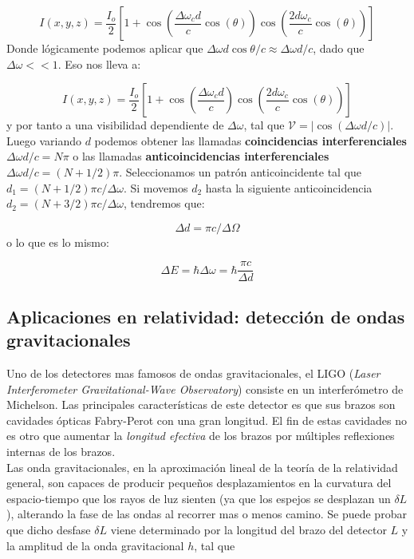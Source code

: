 \documentclass[12pt,a4paper]{book}
\numberwithin{equation}{section}
\numberwithin{figure}{section}
\newcommand{\parentesis}[1]{\left( #1  \right)}
\newcommand{\ccorchetes}[1]{\left[ #1  \right]}
\newcommand{\1}{_{(1)}}
\newcommand{\2}{_{(2)}}
\theoremstyle{definition}
\begin{document}
\begin{equation}
I(x,y,z) = \frac{I_o}{2}  \ccorchetes{1+ \cos \parentesis{\frac{\Delta \omega_c d}{c} \cos (\theta)} \cos \parentesis{\frac{2d\omega_c}{c} \cos (\theta)}}
\end{equation}
Donde lógicamente podemos aplicar que $\Delta \omega d \cos \theta /c \approx \Delta \omega d/c$, dado que $\Delta \omega << 1$. Eso nos lleva a:


\begin{equation}
I(x,y,z) = \frac{I_o}{2}  \ccorchetes{1+ \cos \parentesis{\frac{\Delta \omega_c d}{c}} \cos \parentesis{\frac{2d\omega_c}{c} \cos (\theta)}}
\end{equation}
y por tanto a una visibilidad dependiente de $\Delta \omega$, tal que $\mathcal{V}= |\cos (\Delta \omega d /c)|$. Luego variando $d$ podemos obtener las llamadas \textbf{coincidencias interferenciales} $\Delta \omega d /c = N \pi$ o las llamadas \textbf{anticoincidencias interferenciales} $\Delta \omega d / c = (N+1/2) \pi$. Seleccionamos un patrón anticoincidente tal que $d_1=(N+1/2)\pi c /\Delta \omega$. Si movemos $d_2$ hasta la siguiente anticoincidencia $d_2 = (N+3/2)\pi c /\Delta \omega$, tendremos que:

\begin{equation}
\Delta d = \pi c/\Delta \Omega
\end{equation}
o lo que es lo mismo:

\begin{equation}
\Delta E = \hbar \Delta \omega = \hbar \frac{\pi c}{\Delta d}
\end{equation}

\subsection{Aplicaciones en relatividad: detección de ondas gravitacionales}

Uno de los detectores mas famosos de ondas gravitacionales, el LIGO (\textit{Laser Interferometer Gravitational-Wave Observatory}) consiste en un interferómetro de Michelson. Las principales características de este detector es que sus brazos son cavidades ópticas Fabry-Perot con una gran longitud. El fin de estas cavidades no es otro que aumentar la \textit{longitud efectiva} de los brazos por múltiples reflexiones internas de los brazos. \\

Las onda gravitacionales, en la aproximación lineal de la teoría de la relatividad general, son capaces de producir pequeños desplazamientos en la curvatura del espacio-tiempo que los rayos de luz sienten (ya que los espejos se desplazan un $\delta L$), alterando la fase de las ondas al recorrer mas o menos camino. Se puede probar que dicho desfase $\delta L$ viene determinado por la longitud del brazo del detector $L$ y la amplitud de la onda gravitacional $h$, tal que 
\end{document}
